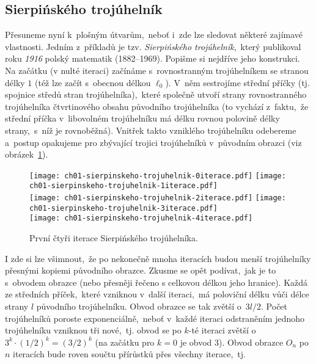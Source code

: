\subsection{Sierpińského trojúhelník}\label{subsec:sierpinskeho_trojuhelnik}
Přesuneme nyní k~plošným útvarům,~neboť i~zde lze sledovat některé zajímavé vlastnosti. Jedním z~příkladů je tzv. \emph{Sierpińského trojúhelník},~který publikoval roku \emph{1916} polský matematik  \mbox{(1882--1969)}. \citep[str. 61]{Peitgen2004} Popišme si nejdříve jeho konstrukci. Na začátku (v nulté iteraci) začínáme s~rovnostranným trojúhelníkem se stranou délky $1$ (též lze začít s~obecnou délkou $\ell_0$). V~něm sestrojíme střední příčky (tj. spojnice středů stran trojúhelníka),~které společně utvoří strany rovnostranného trojúhelníka čtvrtinového obsahu původního trojúhelníka (to vychází z~faktu,~že střední příčka v~libovolném trojúhelníku má délku rovnou polovině délky strany,~s~níž je rovnoběžná). Vnitřek takto vzniklého trojúhelníku odebereme a~postup opakujeme pro zbývající trojici trojúhelníků v~původním obrazci (viz obrázek~\ref{fig:sierpinskeho-trojuhelnik-5iteraci}).\par
\begin{figure}[h]
    \centering
    \texttt{[image: ch01-sierpinskeho-trojuhelnik-0iterace.pdf]}\qquad
    \texttt{[image: ch01-sierpinskeho-trojuhelnik-1iterace.pdf]}\qquad\\
    \texttt{[image: ch01-sierpinskeho-trojuhelnik-2iterace.pdf]}\qquad
    \texttt{[image: ch01-sierpinskeho-trojuhelnik-3iterace.pdf]}\qquad\\
    \texttt{[image: ch01-sierpinskeho-trojuhelnik-4iterace.pdf]}
    \caption{První čtyři iterace Sierpińského trojúhelníka.}
    \label{fig:sierpinskeho-trojuhelnik-5iteraci}
\end{figure}
I zde si lze všimnout,~že po nekonečně mnoha iteracích budou menší trojúhelníky přesnými kopiemi původního obrazce. Zkusme se opět podívat,~jak je to s~obvodem obrazce (nebo přesněji řečeno s celkovou délkou jeho hranice). Každá ze středních příček,~které vzniknou v~další iteraci,~má poloviční délku vůči délce strany $l$ původního trojúhelníku. Obvod obrazce se tak zvětší o~$3l/2$. Počet trojúhelníků poroste exponenciálně,~neboť v~každé iteraci odstraněním jednoho trojúhelníku vzniknou tři nové,~tj. obvod se po $k$-té iteraci zvětší o~$3^k\cdot(1/2)^k=(3/2)^k$ (na začátku pro $k=0$ je obvod $3$). Obvod obrazce $O_n$ po $n$ iteracích bude roven součtu přírůstků přes všechny iterace,~tj.
